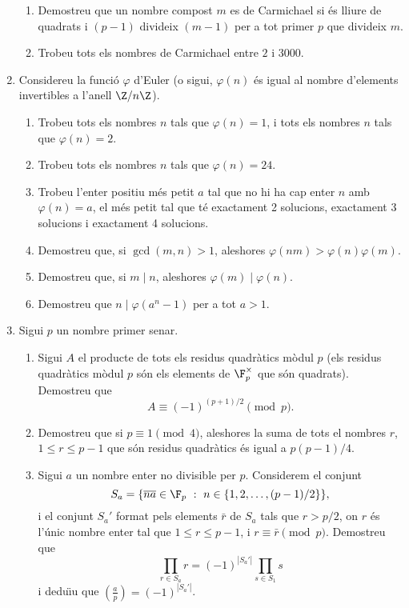 \begin{enumerate}[leftmargin=*]
\begin{enumerate}
\item Demostreu que un nombre compost $m$ es de Carmichael si
és lliure de quadrats i $(p-1)$ divideix $(m-1)$ per a tot primer
$p$ que divideix $m$.

\item Trobeu tots els nombres de Carmichael entre $2$ i $3000$.

\end{enumerate}

\item Considereu la funció $\varphi$ d'Euler (o sigui,
$\varphi(n)$ és igual al nombre d'elements invertibles a l'anell
$\Z/n \Z$).

\begin{enumerate}
\item Trobeu tots els nombres $n$ tals que $\varphi(n)=1$, i
tots els nombres $n$ tals que $\varphi(n)=2$.

\item Trobeu tots els nombres $n$ tals que $\varphi(n)=24$.

\item Trobeu l'enter positiu més petit $a$ tal que no hi ha
cap enter $n$ amb $\varphi(n)=a$, el més petit tal que té
exactament 2 solucions, exactament 3 solucions i exactament 4
solucions.

\item Demostreu que, si $\gcd(m,n)>1$, aleshores
$\varphi(nm)>\varphi(n)\varphi(m)$.

\item Demostreu que, si $m \mid n$, aleshores $\varphi(m)\mid
\varphi(n)$.

\item Demostreu que  $n \mid \varphi(a^n-1)$ per a tot $a>1$.
\end{enumerate}

\item Sigui $p$ un nombre primer senar.
\begin{enumerate}

\item Sigui $A$ el producte
de tots els residus quadràtics mòdul $p$ (els residus quadràtics
mòdul $p$ són els elements de $\F_p^\times$ que són quadrats). Demostreu
que 
\[
A\equiv (-1)^{(p+1)/2} \pmod{p}.
\]
\item Demostreu que si $p\equiv 1\pmod{4}$, aleshores la suma de tots el nombres $r$, $1 \le r \le p-1$ que
són residus quadràtics és igual a $p(p-1)/4$.

\item Sigui $a$ un nombre enter no divisible per $p$. Considerem el conjunt $$S_a=\{\overline{na}\in \F_p \ : \
n\in \{1,2,\dots,(p-1)/2\} \},$$ i el conjunt $S_a'$  format pels
elements $\bar r$ de $S_a$ tals que $r>p/2$, on $r$ és l'únic nombre
enter tal que $1\le r\le p-1$, i $r\equiv \bar r \pmod{p}$.
Demostreu que $$\prod_{r\in S_a} r=(-1)^{|S_a'|}\prod_{s\in S_1}s$$
i dedu\"{\i}u que $\left(\frac{a}{p}\right)=(-1)^{|S_a'|}$.
\end{enumerate}



\end{enumerate}
